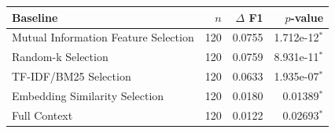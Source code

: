 \begin{tabular}{lrrr}
\toprule
Baseline & $n$ & $\Delta$ F1 & $p$-value \\
\midrule
Mutual Information Feature Selection & 120 & 0.0755 & 1.712e-12$^*$ \\
Random-k Selection & 120 & 0.0759 & 8.931e-11$^*$ \\
TF-IDF/BM25 Selection & 120 & 0.0633 & 1.935e-07$^*$ \\
Embedding Similarity Selection & 120 & 0.0180 & 0.01389$^*$ \\
Full Context & 120 & 0.0122 & 0.02693$^*$ \\
\bottomrule
\end{tabular}
